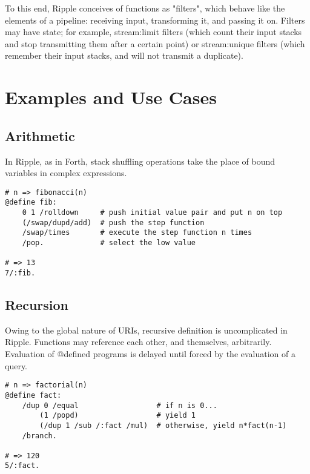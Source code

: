 \documentclass[runningheads]{llncs}
\begin{document}
To this end, Ripple conceives of functions as "filters", which behave like the elements of a pipeline: receiving input, transforming it, and passing it on.  Filters may have state; for example, stream:limit filters (which count their input stacks and stop transmitting them after a certain point) or stream:unique filters (which remember their input stacks, and will not transmit a duplicate).


\section{Examples and Use Cases}

\subsection{Arithmetic}
In Ripple, as in Forth, stack shuffling operations take the place of bound variables in complex expressions.
\begin{verbatim}
# n => fibonacci(n)
@define fib:
    0 1 /rolldown     # push initial value pair and put n on top
    (/swap/dupd/add)  # push the step function
    /swap/times       # execute the step function n times
    /pop.             # select the low value

# => 13
7/:fib.
\end{verbatim}


\subsection{Recursion}
Owing to the global nature of URIs, recursive definition is uncomplicated in Ripple.  Functions may reference each other, and themselves, arbitrarily.  Evaluation of @defined programs is delayed until forced by the evaluation of a query.
\begin{verbatim}
# n => factorial(n)
@define fact:
    /dup 0 /equal                  # if n is 0...
        (1 /popd)                  # yield 1
        (/dup 1 /sub /:fact /mul)  # otherwise, yield n*fact(n-1)
    /branch.

# => 120
5/:fact.
\end{verbatim}
\end{document}
